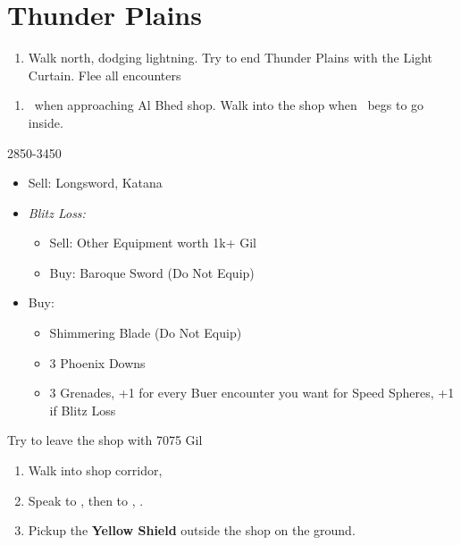\chapter{Thunder Plains}

\begin{enumerate}
  \item Walk north, dodging lightning. Try to end Thunder Plains with the Light Curtain. Flee all encounters
\end{enumerate}
\begin{enumerate}[resume]
  \item \sd\ when approaching Al Bhed shop. Walk into the shop when \rikku\ begs to go inside.
\end{enumerate}
\begin{shop}{2850-3450}
  \begin{itemize}
    \item Sell: Longsword, Katana
    \item \textit{Blitz Loss:}
          \begin{itemize}
            \item Sell: Other Equipment worth 1k+ Gil
            \item Buy: Baroque Sword (Do Not Equip)
          \end{itemize}
    \item Buy:
          \begin{itemize}
            \item Shimmering Blade (Do Not Equip)
            \item 3 Phoenix Downs
            \item 3 Grenades, +1 for every Buer encounter you want for Speed Spheres, +1 if Blitz Loss
          \end{itemize}
  \end{itemize}
Try to leave the shop with 7075 Gil
\end{shop}
\begin{enumerate}[resume]
  \item Walk into shop corridor, \cs[2:00]
  \item Speak to \auron, then to \rikku, \sd.
  \item Pickup the \textbf{Yellow Shield} outside the shop on the ground.
  \end{enumerate}
  
